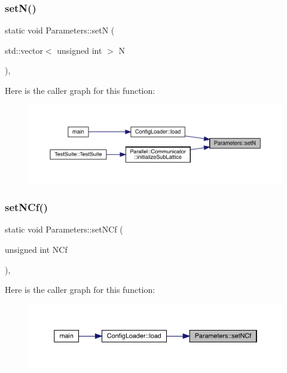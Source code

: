 \subsubsection{\texorpdfstring{setN()}{setN()}}
{\footnotesize\ttfamily static void Parameters\+::setN (\begin{DoxyParamCaption}\item[{std\+::vector$<$ unsigned int $>$}]{N }\end{DoxyParamCaption})\hspace{0.3cm}{\ttfamily [inline]}, {\ttfamily [static]}}

Here is the caller graph for this function\+:\nopagebreak
\begin{figure}[H]
\begin{center}
\leavevmode
\includegraphics[width=350pt]{class_parameters_a0e0118ebbe8f19148a5c6d737c7a2c85_icgraph}
\end{center}
\end{figure}
\mbox{\label{class_parameters_a3c35caa5de4bb545a2b48af07e1756f3}} 
\subsubsection{\texorpdfstring{setNCf()}{setNCf()}}
{\footnotesize\ttfamily static void Parameters\+::set\+N\+Cf (\begin{DoxyParamCaption}\item[{unsigned int}]{N\+Cf }\end{DoxyParamCaption})\hspace{0.3cm}{\ttfamily [inline]}, {\ttfamily [static]}}

Here is the caller graph for this function\+:\nopagebreak
\begin{figure}[H]
\begin{center}
\leavevmode
\includegraphics[width=350pt]{class_parameters_a3c35caa5de4bb545a2b48af07e1756f3_icgraph}
\end{center}
\end{figure}
\mbox{\label{class_parameters_afb3ef2dca9d24511a1904bc313fd8513}} 

